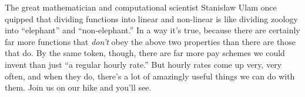
The great mathematician and computational scientist Stanis\l{}aw Ulam once
quipped that dividing functions into linear and non-linear is like dividing
zoology into ``elephant'' and ``non-elephant.'' In a way it's true, because
there are certainly far more functions that \textit{don't} obey the above two
properties than there are those that do. By the same token, though, there are
far more pay schemes we could invent than just ``a regular hourly rate.'' But
hourly rates come up very, very often, and when they do, there's a lot of
amazingly useful things we can do with them. Join us on our hike and you'll
see.

